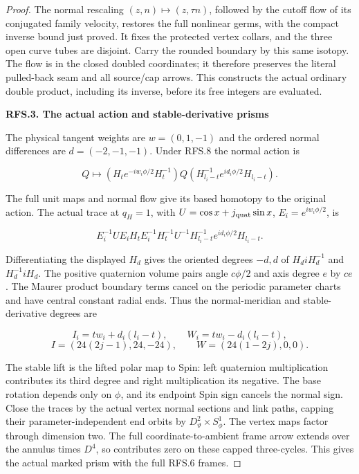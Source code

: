 \begin{proof}
The normal rescaling \((z,n)\mapsto(z,\tau n)\), followed by the
cutoff flow of its conjugated family velocity, restores the full
nonlinear germs, with the compact inverse bound just proved. It
fixes the protected vertex collars, and the three open curve tubes
are disjoint. Carry the rounded boundary by this same isotopy.
The flow is in the closed doubled coordinates; it therefore
preserves the literal pulled-back seam and all source/cap arrows.
This constructs the actual ordinary double product, including its
inverse, before its free integers are evaluated.

\par

\medskip\noindent\textbf{RFS.3. The actual action and stable-derivative prisms}

\par\nobreak

The physical tangent weights are \(w=(0,1,-1)\) and the ordered
normal differences are \(d=(-2,-1,-1)\). Under RFS.8 the normal
action is

\[
 Q\longmapsto
 (H_t e^{-iw_i\phi/2}H_t^{-1})Q
 (H_{l_i-t}^{-1}e^{id_i\phi/2}H_{l_i-t}).
 \tag{RFS.9}
\]

The full unit maps and normal flow give its based homotopy to the
original action. The actual trace at \(q_H=1\), with
\(U=\cos x+j_{\rm quat}\sin x\), \(E_i=e^{iw_i\phi/2}\), is

\[
 E_i^{-1}UE_iH_tE_i^{-1}H_t^{-1}U^{-1}
                 H_{l_i-t}^{-1}e^{id_i\phi/2}H_{l_i-t}.
 \tag{RFS.10}
\]

Differentiating the displayed \(H_d\) gives the oriented degrees
\(-d,d\) of \(H_diH_d^{-1}\) and \(H_d^{-1}iH_d\).
The positive quaternion volume pairs angle \(c\phi/2\) and axis
degree \(e\) by \(ce\). The Maurer product boundary terms cancel
on the periodic parameter charts and have central constant radial
ends. Thus the normal-meridian and stable-derivative degrees are

\[
 I_i=tw_i+d_i(l_i-t),\qquad W_i=tw_i-d_i(l_i-t),
\]
\[
 I=(24(2j-1),24,-24),\qquad W=(24(1-2j),0,0).
 \tag{RFS.11}
\]

The stable lift is the lifted polar map to Spin: left quaternion
multiplication contributes its third degree and right multiplication
its negative. The base rotation depends only on \(\phi\), and
its endpoint Spin sign cancels the normal sign. Close the traces
by the actual vertex normal sections and link paths, capping their
parameter-independent end orbits by \(D^2_\vartheta\times S^1_\phi\).
The vertex maps factor through dimension two. The full
coordinate-to-ambient frame arrow extends over the annulus times
\(D^4\), so contributes zero on these capped three-cycles. This
gives the actual marked prism with the full RFS.6 frames.


\end{proof}
